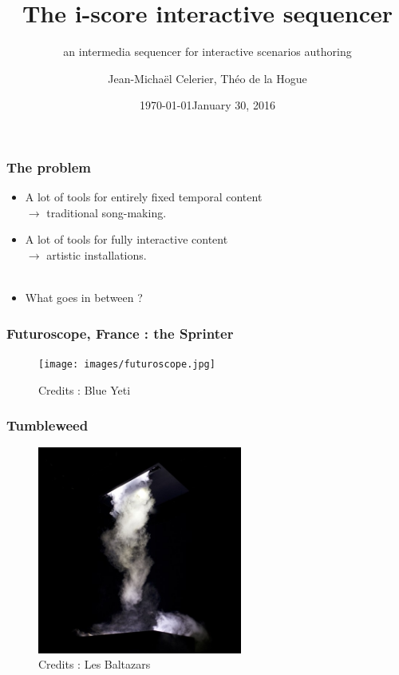 \documentclass{beamer}
\title{The i-score interactive sequencer}
\subtitle{an intermedia sequencer for interactive scenarios authoring}
\date{\today}
\author{Jean-Michaël Celerier, Théo de la Hogue}
\institute{LaBRI, Blue Yeti, GMEA }
\date{January 30, 2016}
\begin{document}
    
\maketitle

\begin{frame}
    \frametitle{The problem}    
    \Large
    \begin{itemize}
    	\item A lot of tools for entirely fixed temporal content \\ $\rightarrow$ traditional song-making.
    	\item A lot of tools for fully interactive content  \\  $\rightarrow$ artistic installations.~\\~\\
    	\item What goes in between ?    	
    \end{itemize}    
\end{frame}

\begin{frame}
    \frametitle{Futuroscope, France : the Sprinter}        

    \begin{figure}
        \centering
        \texttt{[image: images/futuroscope.jpg]}
        \caption{Credits : Blue Yeti}
    \end{figure}
\end{frame}


\begin{frame}
    \frametitle{Tumbleweed}       
    
    \begin{figure}
    	\centering
    	\includegraphics[width=0.6\textwidth]{images/tumbleweed.jpg}
    	\caption{Credits : Les Baltazars}
    \end{figure}
\end{frame}
\end{document}
